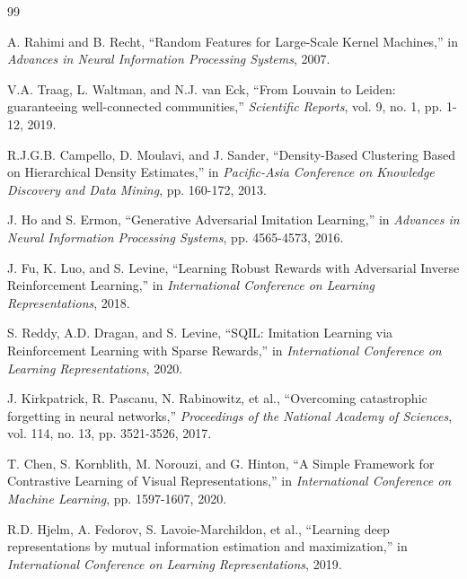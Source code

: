 \documentclass{article}
\begin{document}
\begin{thebibliography}{99}

A. Rahimi and B. Recht, ``Random Features for Large-Scale Kernel Machines,'' in \textit{Advances in Neural Information Processing Systems}, 2007.

V.A. Traag, L. Waltman, and N.J. van Eck, ``From Louvain to Leiden: guaranteeing well-connected communities,'' \textit{Scientific Reports}, vol. 9, no. 1, pp. 1-12, 2019.

R.J.G.B. Campello, D. Moulavi, and J. Sander, ``Density-Based Clustering Based on Hierarchical Density Estimates,'' in \textit{Pacific-Asia Conference on Knowledge Discovery and Data Mining}, pp. 160-172, 2013.

J. Ho and S. Ermon, ``Generative Adversarial Imitation Learning,'' in \textit{Advances in Neural Information Processing Systems}, pp. 4565-4573, 2016.

J. Fu, K. Luo, and S. Levine, ``Learning Robust Rewards with Adversarial Inverse Reinforcement Learning,'' in \textit{International Conference on Learning Representations}, 2018.

S. Reddy, A.D. Dragan, and S. Levine, ``SQIL: Imitation Learning via Reinforcement Learning with Sparse Rewards,'' in \textit{International Conference on Learning Representations}, 2020.

J. Kirkpatrick, R. Pascanu, N. Rabinowitz, et al., ``Overcoming catastrophic forgetting in neural networks,'' \textit{Proceedings of the National Academy of Sciences}, vol. 114, no. 13, pp. 3521-3526, 2017.

T. Chen, S. Kornblith, M. Norouzi, and G. Hinton, ``A Simple Framework for Contrastive Learning of Visual Representations,'' in \textit{International Conference on Machine Learning}, pp. 1597-1607, 2020.

R.D. Hjelm, A. Fedorov, S. Lavoie-Marchildon, et al., ``Learning deep representations by mutual information estimation and maximization,'' in \textit{International Conference on Learning Representations}, 2019.

\end{thebibliography}
\end{document}
